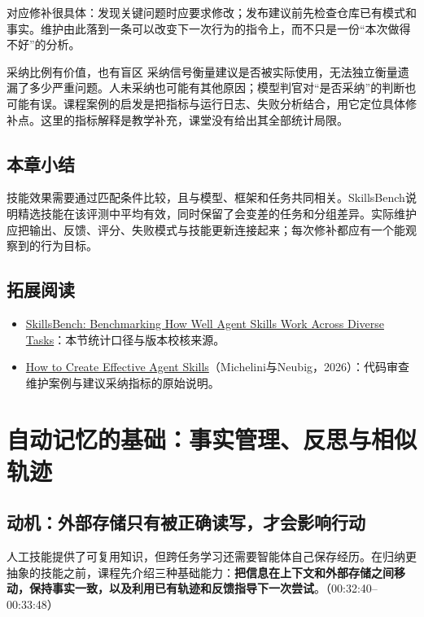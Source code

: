 \documentclass[11pt,a4paper]{article}
\begin{document}
对应修补很具体：发现关键问题时应要求修改；发布建议前先检查仓库已有模式和事实。维护由此落到一条可以改变下一次行为的指令上，而不只是一份“本次做得不好”的分析。

\begin{knowledgebox}{采纳比例有价值，也有盲区}
采纳信号衡量建议是否被实际使用，无法独立衡量遗漏了多少严重问题。人未采纳也可能有其他原因；模型判官对“是否采纳”的判断也可能有误。课程案例的启发是把指标与运行日志、失败分析结合，用它定位具体修补点。这里的指标解释是教学补充，课堂没有给出其全部统计局限。
\end{knowledgebox}

\subsection{本章小结}

技能效果需要通过匹配条件比较，且与模型、框架和任务共同相关。SkillsBench说明精选技能在该评测中平均有效，同时保留了会变差的任务和分组差异。实际维护应把输出、反馈、评分、失败模式与技能更新连接起来；每次修补都应有一个能观察到的行为目标。

\subsection{拓展阅读}

\begin{itemize}
\item \href{https://arxiv.org/html/2602.12670}{SkillsBench: Benchmarking How Well Agent Skills Work Across Diverse Tasks}：本节统计口径与版本校核来源。
\item \href{https://www.openhands.dev/blog/20260227-creating-effective-agent-skills}{How to Create Effective Agent Skills}（Michelini与Neubig，2026）：代码审查维护案例与建议采纳指标的原始说明。
\end{itemize}

\clearpage
\section{自动记忆的基础：事实管理、反思与相似轨迹}
\label{sec:l4-memory-foundations}

\subsection{动机：外部存储只有被正确读写，才会影响行动}

人工技能提供了可复用知识，但跨任务学习还需要智能体自己保存经历。在归纳更抽象的技能之前，课程先介绍三种基础能力：\textbf{把信息在上下文和外部存储之间移动，保持事实一致，以及利用已有轨迹和反馈指导下一次尝试}。（00:32:40--00:33:48）
\end{document}
